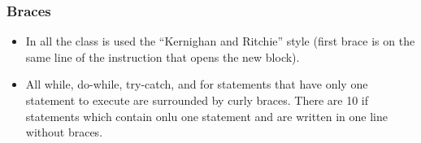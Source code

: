 \subsubsection{Braces}
\begin{itemize}
\item In all the class is used the “Kernighan and
Ritchie” style (first brace is on the same line of the instruction that
opens the new block).\\

\item All while, do-while, try-catch, and for statements that have
only one statement to execute are surrounded by curly braces. There are 10 if statements which contain onlu one statement and are written in one line without braces.\\

\end{itemize}

